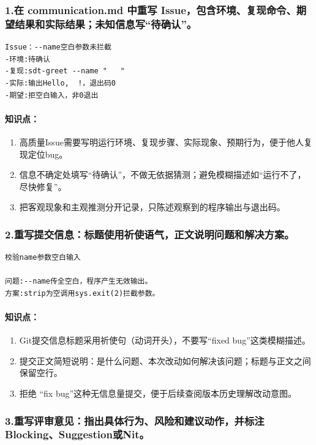 \documentclass{article}
\begin{document}
\subsubsection*{1.在 communication.md 中重写 Issue，包含环境、复现命令、期望结果和实际结果；未知信息写“待确认”。}

\begin{lstlisting}
Issue：--name空白参数未拦截
-环境:待确认
-复现:sdt-greet --name "   "
-实际:输出Hello,  !，退出码0
-期望:拒空白输入，非0退出
\end{lstlisting}
\paragraph{知识点：}
\begin{enumerate}
\item 高质量Issue需要写明运行环境、复现步骤、实际现象、预期行为，便于他人复现定位bug。
\item 信息不确定处填写“待确认”，不做无依据猜测；避免模糊描述如“运行不了，尽快修复”。
\item 把客观现象和主观推测分开记录，只陈述观察到的程序输出与退出码。
\end{enumerate}

\subsubsection*{2.重写提交信息：标题使用祈使语气，正文说明问题和解决方案。}

\begin{lstlisting}
校验name参数空白输入

问题:--name传全空白，程序产生无效输出。
方案:strip为空调用sys.exit(2)拦截参数。
\end{lstlisting}
\paragraph{知识点：}
\begin{enumerate}
\item Git提交信息标题采用祈使句（动词开头），不要写“fixed bug”这类模糊描述。
\item 提交正文简短说明：是什么问题、本次改动如何解决该问题；标题与正文之间保留空行。
\item 拒绝 “fix bug”这种无信息量提交，便于后续查阅版本历史理解改动意图。
\end{enumerate}

\subsubsection*{3.重写评审意见：指出具体行为、风险和建议动作，并标注Blocking、Suggestion或Nit。}
\end{document}
